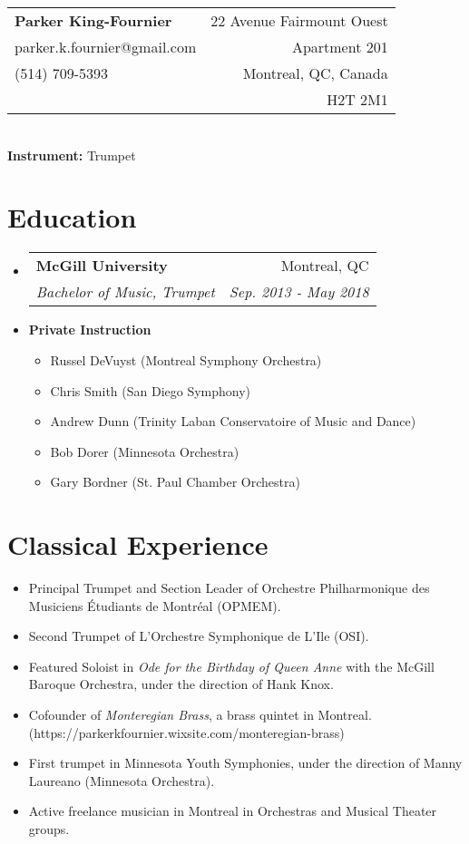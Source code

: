\documentclass[letterpaper,11pt]{article}
\makeatletter
\newcommand{\resitem}[1]{\item #1 \vspace{-2pt}}
\newcommand{\ressubheading}[4]{
\begin{tabular*}{6.1in}{l@{\extracolsep{\fill}}r}
		\textbf{#1} & #2 \\
		\textit{#3} & \textit{#4} \\
\end{tabular*}\vspace{-1pt}}
\makeatother
\begin{document}
\begin{tabular*}{6.5in}{l@{\extracolsep{\fill}}r}
\textbf{\Large Parker King-Fournier}  & 22 Avenue Fairmount Ouest\\
parker.k.fournier@gmail.com & Apartment 201 \\
(514) 709-5393 & Montreal, QC, Canada\\
& H2T 2M1\\
\end{tabular*}\\

\textbf{Instrument:} Trumpet

\vspace{0.1in}

\section*{Education}
\begin{itemize}

\item
	\ressubheading{McGill University}{Montreal, QC}{Bachelor of Music, Trumpet}{Sep. 2013 - May 2018}

\item	
	\textbf{Private Instruction}
	\begin{itemize}
	    \resitem{Russel DeVuyst (Montreal Symphony Orchestra)}
	    \resitem{Chris Smith (San Diego Symphony)}
	    \resitem{Andrew Dunn (Trinity Laban Conservatoire of Music and Dance)}
	    \resitem{Bob Dorer (Minnesota Orchestra)} 
	    \resitem{Gary Bordner (St. Paul Chamber Orchestra)}
	\end{itemize}
	
\end{itemize}

\section*{Classical Experience}
\begin{itemize}
    \item Principal Trumpet and Section Leader of Orchestre Philharmonique des Musiciens Étudiants de Montréal (OPMEM).
    
    \item Second Trumpet of L'Orchestre Symphonique de L'Ile (OSI).
    
    \item Featured Soloist in \textit{Ode for the Birthday of Queen Anne} with the McGill Baroque Orchestra, under the direction of Hank Knox.
    
    \item Cofounder of \textit{Monteregian Brass}, a brass quintet in Montreal. (https://parkerkfournier.wixsite.com/monteregian-brass)
    
    \item First trumpet in Minnesota Youth Symphonies, under the direction of Manny Laureano (Minnesota Orchestra).
    
    \item Active freelance musician in Montreal in Orchestras and Musical Theater groups.
\end{itemize}
\end{document}

